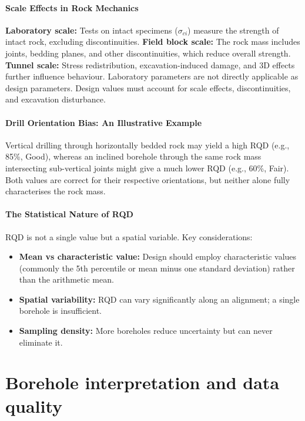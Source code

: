 \paragraph{Scale Effects in Rock Mechanics}

\begin{notebox}
\textbf{Laboratory scale:} Tests on intact specimens ($\sigma_{ci}$) measure the strength of intact rock, excluding discontinuities.
\textbf{Field block scale:} The rock mass includes joints, bedding planes, and other discontinuities, which reduce overall strength.
\textbf{Tunnel scale:} Stress redistribution, excavation-induced damage, and 3D effects further influence behaviour.
Laboratory parameters are not directly applicable as design parameters. Design values must account for scale effects, discontinuities, and excavation disturbance.
\end{notebox}

\paragraph{Drill Orientation Bias: An Illustrative Example}
\label{sec:orientation-bias}
Vertical drilling through horizontally bedded rock may yield a high RQD (e.g., 85\%, Good), whereas an inclined borehole through the same rock mass intersecting sub-vertical joints might give a much lower RQD (e.g., 60\%, Fair). Both values are correct for their respective orientations, but neither alone fully characterises the rock mass.

\paragraph{The Statistical Nature of RQD}
RQD is not a single value but a spatial variable. Key considerations:
\begin{itemize}
 \item \textbf{Mean vs characteristic value:} Design should employ characteristic values (commonly the 5th percentile or mean minus one standard deviation) rather than the arithmetic mean.
 \item \textbf{Spatial variability:} RQD can vary significantly along an alignment; a single borehole is insufficient.
 \item \textbf{Sampling density:} More boreholes reduce uncertainty but can never eliminate it.
\end{itemize}

\section{Borehole interpretation and data quality}
\label{sec:borehole-interpretation-and-data-quality}

